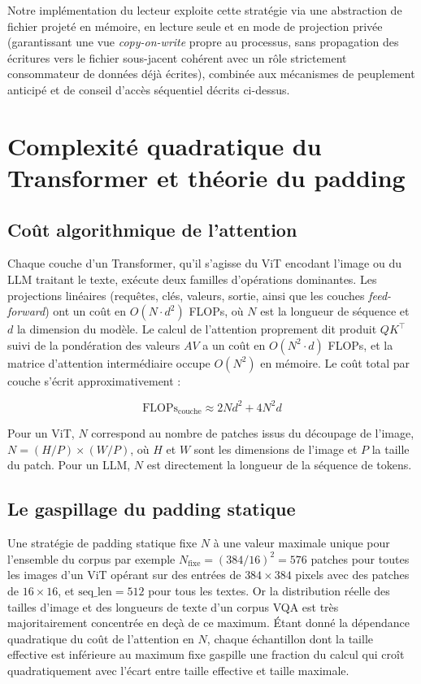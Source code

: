 \documentclass[12pt,a4paper]{report}
\begin{document}
Notre implémentation du lecteur exploite cette stratégie via une abstraction de fichier projeté en mémoire, en lecture seule et en mode de projection privée (garantissant une vue \textit{copy-on-write} propre au processus, sans propagation des écritures vers le fichier sous-jacent cohérent avec un rôle strictement consommateur de données déjà écrites), combinée aux mécanismes de peuplement anticipé et de conseil d'accès séquentiel décrits ci-dessus.

\section{Complexité quadratique du Transformer et théorie du padding}
\label{sec:padding}

\subsection{Coût algorithmique de l'attention}

Chaque couche d'un Transformer, qu'il s'agisse du ViT encodant l'image ou du LLM traitant le texte, exécute deux familles d'opérations dominantes. Les projections linéaires (requêtes, clés, valeurs, sortie, ainsi que les couches \textit{feed-forward}) ont un coût en $O(N \cdot d^2)$ FLOPs, où $N$ est la longueur de séquence et $d$ la dimension du modèle. Le calcul de l'attention proprement dit produit $QK^\top$ suivi de la pondération des valeurs $AV$ a un coût en $O(N^2 \cdot d)$ FLOPs, et la matrice d'attention intermédiaire occupe $O(N^2)$ en mémoire. Le coût total par couche s'écrit approximativement :

\begin{equation}
\label{eq:transformer_flops}
\text{FLOPs}_{\text{couche}} \approx 2N d^2 + 4N^2 d
\end{equation}

Pour un ViT, $N$ correspond au nombre de patches issus du découpage de l'image, $N = (H/P) \times (W/P)$, où $H$ et $W$ sont les dimensions de l'image et $P$ la taille du patch. Pour un LLM, $N$ est directement la longueur de la séquence de tokens.

\subsection{Le gaspillage du padding statique}

Une stratégie de padding statique fixe $N$ à une valeur maximale unique pour l'ensemble du corpus par exemple $N_{\text{fixe}} = (384/16)^2 = 576$ patches pour toutes les images d'un ViT opérant sur des entrées de $384 \times 384$ pixels avec des patches de $16 \times 16$, et $\text{seq\_len} = 512$ pour tous les textes. Or la distribution réelle des tailles d'image et des longueurs de texte d'un corpus VQA est très majoritairement concentrée en deçà de ce maximum. Étant donné la dépendance quadratique du coût de l'attention en $N$, chaque échantillon dont la taille effective est inférieure au maximum fixe gaspille une fraction du calcul qui croît quadratiquement avec l'écart entre taille effective et taille maximale.
\end{document}
